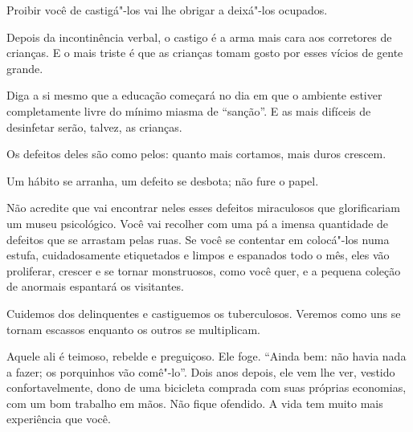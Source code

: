 \bigskip
\bigskip

Proibir você de castigá"-los vai lhe obrigar a deixá"-los ocupados.

\bigskip
\bigskip

Depois da incontinência verbal, o castigo é a arma mais cara aos
corretores de crianças. E o mais triste é que as crianças tomam gosto
por esses vícios de gente grande.

\bigskip
\bigskip

Diga a si mesmo que a educação começará no dia em que o ambiente estiver
completamente livre do mínimo miasma de ``sanção''. E as mais difíceis
de desinfetar serão, talvez, as crianças.

\bigskip
\bigskip

Os defeitos deles são como pelos: quanto mais cortamos, mais duros
crescem.

\bigskip
\bigskip

Um hábito se arranha, um defeito se desbota; não fure o papel.

\bigskip
\bigskip

Não acredite que vai encontrar neles esses defeitos miraculosos que
glorificariam um museu psicológico. Você vai recolher com uma pá a
imensa quantidade de defeitos que se arrastam pelas ruas. Se você se
contentar em colocá"-los numa estufa, cuidadosamente etiquetados e limpos
e espanados todo o mês, eles vão proliferar, crescer e se tornar
monstruosos, como você quer, e a pequena coleção de anormais espantará
os visitantes.

\bigskip
\bigskip

Cuidemos dos delinquentes e castiguemos os tuberculosos. Veremos como
uns se tornam escassos enquanto os outros se multiplicam.

\bigskip
\bigskip

Aquele ali é teimoso, rebelde e preguiçoso. Ele foge. ``Ainda bem: não
havia nada a fazer; os porquinhos vão comê"-lo''. Dois anos depois, ele
vem lhe ver, vestido confortavelmente, dono de uma bicicleta comprada
com suas próprias economias, com um bom trabalho em mãos. Não fique
ofendido. A vida tem muito mais experiência que você.

\bigskip
\bigskip


\pagebreak
\thispagestyle{empty}

